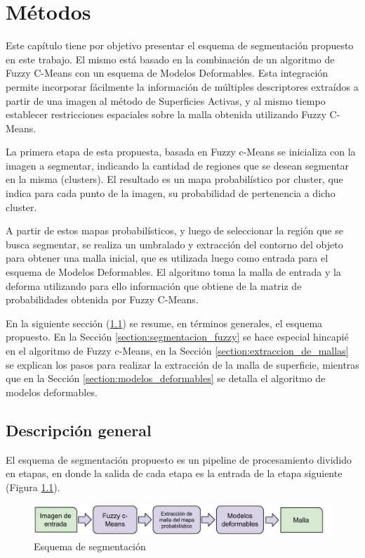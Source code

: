 \chapter{Métodos}\label{chapter:metodos}
Este capítulo tiene por objetivo presentar el esquema de segmentación propuesto en este trabajo.  El mismo está basado en la combinación de un algoritmo de Fuzzy C-Means con un esquema de Modelos Deformables. Esta integración permite incorporar fácilmente la información de múltiples descriptores extraídos a partir de una imagen al método de Superficies Activas, y al mismo tiempo establecer restricciones espaciales sobre la malla obtenida utilizando Fuzzy C-Means.
 
La primera etapa de esta propuesta, basada en Fuzzy c-Means se inicializa con la imagen a segmentar, indicando la cantidad de regiones que se desean segmentar en la misma (clusters). El resultado es un mapa probabilístico por cluster, que indica para cada punto de la imagen, su probabilidad de pertenencia a dicho cluster.

A partir de estos mapas probabilísticos, y luego de seleccionar la región que se busca segmentar, se realiza un umbralado y extracción del contorno del objeto para obtener una malla inicial, que es utilizada luego como entrada para el esquema de Modelos Deformables. El algoritmo toma la malla de entrada y la deforma utilizando para ello información que obtiene de la matriz de probabilidades obtenida por Fuzzy C-Means.

En la siguiente sección (\ref{section:descripcion_general}) se resume, en términos generales, el esquema propuesto. En la Sección \ref{section:segmentacion_fuzzy} se hace especial hincapié en el algoritmo de Fuzzy c-Means, en la Sección \ref{section:extraccion_de_mallas} se explican los pasos para realizar la extracción de la malla de superficie, mientras que en la Sección \ref{section:modelos_deformables} se detalla el algoritmo de modelos deformables.

\section{Descripción general}\label{section:descripcion_general}
El esquema de segmentación propuesto es un pipeline de procesamiento dividido en etapas, en donde la salida de cada etapa es la entrada de la etapa siguiente (Figura \ref{fig:esquema_de_segmentacion}).


\begin{figure}[h!]
	\centering
	\includegraphics[scale=0.3]{images/pipeline_de_segmentacion.jpg}
	\caption{Esquema de segmentación}
	\label{fig:esquema_de_segmentacion}
\end{figure}

